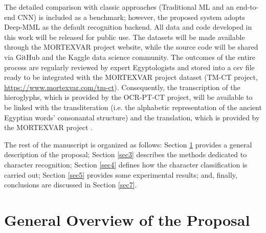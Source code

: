 \documentclass[10pt,onecolumn,letterpaper]{article}
\begin{document}
The detailed comparison with classic approaches (Traditional ML and an end-to-end CNN) is included as a benchmark; however, the proposed system adopts Deep-MML as the default recognition backend. All data and code developed in this work will be released for public use. The datasets will be made available through the MORTEXVAR project website, while the source code will be shared via GitHub and the Kaggle data science community. The outcomes of the entire process are regularly reviewed by expert Egyptologists and stored into a csv file ready to be integrated with the MORTEXVAR project dataset (TM-CT project, \url{https://www.mortexvar.com/tm-ct}). Consequently, the transcription of the hieroglyphs, which is provided by the OCR-PT-CT project, will be available to be linked with the transliteration (i.e. the alphabetic representation of the ancient Egyptian words’ consonantal structure) and the translation, which is provided by the MORTEXVAR project \cite{gracia2013, zamacona2020}. 

The rest of the manuscript is organized as follows: Section \ref{sec2} provides a general description of the proposal; Section \ref{sec3} describes the methods dedicated to character recognition; Section \ref{sec4} defines how the character classification is carried out; Section \ref{sec5} provides some experimental results; and, finally, conclusions are discussed in Section \ref{sec7}.

\section{General Overview of the Proposal}
\label{sec2}
\end{document}
